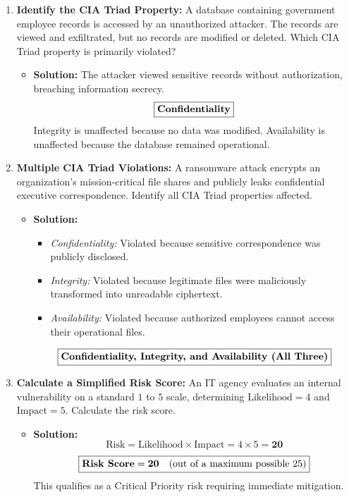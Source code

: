 \begin{enumerate}[label=\textbf{Problem \arabic*.},leftmargin=1.5cm]
\item \textbf{Identify the CIA Triad Property:}
A database containing government employee records is accessed by an unauthorized attacker. The records are viewed and exfiltrated, but no records are modified or deleted. Which CIA Triad property is primarily violated?
\begin{itemize}
\item \textbf{Solution:} The attacker viewed sensitive records without authorization, breaching information secrecy.
\[ \boxed{\text{\textbf{Confidentiality}}} \]
Integrity is unaffected because no data was modified. Availability is unaffected because the database remained operational.
\end{itemize}

\item \textbf{Multiple CIA Triad Violations:}
A ransomware attack encrypts an organization's mission-critical file shares and publicly leaks confidential executive correspondence. Identify all CIA Triad properties affected.
\begin{itemize}
\item \textbf{Solution:}
\begin{itemize}
\item \textit{Confidentiality:} Violated because sensitive correspondence was publicly disclosed.
\item \textit{Integrity:} Violated because legitimate files were maliciously transformed into unreadable ciphertext.
\item \textit{Availability:} Violated because authorized employees cannot access their operational files.
\end{itemize}
\[ \boxed{\text{\textbf{Confidentiality, Integrity, and Availability (All Three)}}} \]
\end{itemize}

\item \textbf{Calculate a Simplified Risk Score:}
An IT agency evaluates an internal vulnerability on a standard $1$ to $5$ scale, determining $\text{Likelihood} = 4$ and $\text{Impact} = 5$. Calculate the risk score.
\begin{itemize}
\item \textbf{Solution:}
\[ \text{Risk} = \text{Likelihood} \times \text{Impact} = 4 \times 5 = \mathbf{20} \]
\[ \boxed{\text{\textbf{Risk Score}} = \mathbf{20} \quad (\text{out of a maximum possible } 25)} \]
This qualifies as a Critical Priority risk requiring immediate mitigation.
\end{itemize}


\end{enumerate}
